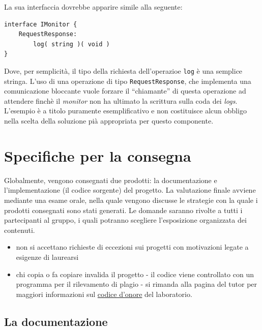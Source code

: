 \documentclass[
]{article}
\providecommand{\tightlist}{%
  \setlength{\itemsep}{0pt}\setlength{\parskip}{0pt}}
\begin{document}
La sua interfaccia dovrebbe apparire simile alla seguente:

\begin{verbatim}
interface IMonitor {
    RequestResponse:
        log( string )( void )
}
\end{verbatim}

Dove, per semplicità, il tipo della richiesta dell'operazioe
\texttt{log} è una semplice stringa. L'uso di una operazione di tipo
\texttt{RequestResponse}, che implementa una comunicazione bloccante
vuole forzare il ``chiamante'' di questa operazione ad attendere finchè
il \emph{monitor} non ha ultimato la scrittura sulla coda dei
\emph{logs}. L'esempio è a titolo puramente esemplificativo e non
costituisce alcun obbligo nella scelta della soluzione pià appropriata
per questo componente.

\hypertarget{specifiche-per-la-consegna}{%
\section{Specifiche per la consegna}\label{specifiche-per-la-consegna}}

Globalmente, vengono consegnati due prodotti: la documentazione e
l'implementazione (il codice sorgente) del progetto. La valutazione
finale avviene mediante una esame orale, nella quale vengono discusse le
strategie con la quale i prodotti consegnati sono stati generati. Le
domande saranno rivolte a tutti i partecipanti al gruppo, i quali
potranno scegliere l'esposizione organizzata dei contenuti.

\begin{itemize}
\tightlist
\item
  non si accettano richieste di eccezioni sui progetti con motivazioni
  legate a esigenze di laurearsi
\item
  chi copia o fa copiare invalida il progetto - il codice viene
  controllato con un programma per il rilevamento di plagio - si rimanda
  alla pagina del tutor per maggiori informazioni sul
  \href{https://spz.netlify.app/teaching/2020/02/24/operative-system-laboratory-computer-science-management}{codice
  d'onore} del laboratorio.
\end{itemize}

\hypertarget{la-documentazione}{%
\subsection{La documentazione}\label{la-documentazione}}
\end{document}
